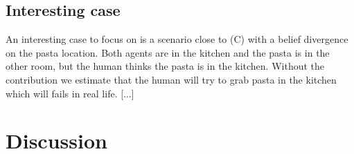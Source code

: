 \documentclass[letterpaper]{article} %
\begin{document}

\subsection{Interesting case}

An interesting case to focus on is a scenario close to (C) with a belief divergence on the pasta location. Both agents are in the kitchen and the pasta is in the other room, but the human thinks the pasta is in the kitchen. Without the contribution we estimate that the human will try to grab pasta in the kitchen which will fails in real life. [...] 




\section{Discussion}
\end{document}
